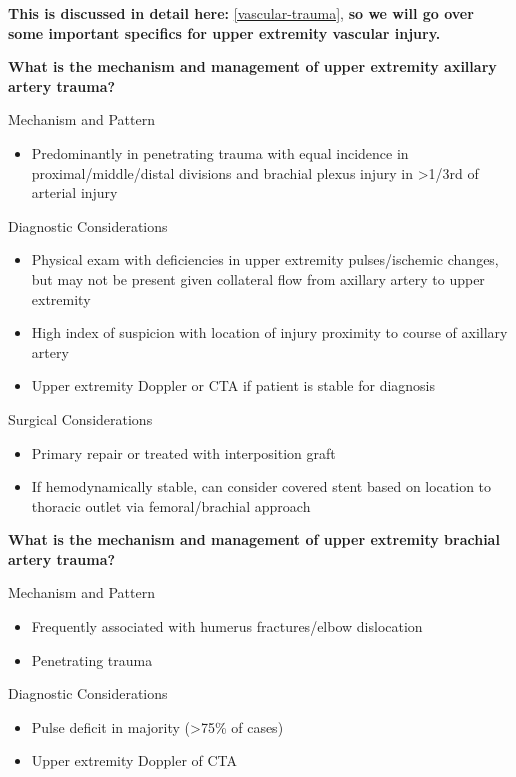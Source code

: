 \documentclass[
]{book}
\providecommand{\tightlist}{%
  \setlength{\itemsep}{0pt}\setlength{\parskip}{0pt}}
\begin{document}
\textbf{This is discussed in detail here:} \ref{vascular-trauma}, \textbf{so we
will go over some important specifics for upper extremity vascular
injury.} \citep{kauvar184VascularTrauma2020}

\textbf{What is the mechanism and management of upper extremity axillary
artery trauma?}

Mechanism and Pattern

\begin{itemize}
\tightlist
\item
  Predominantly in penetrating trauma with equal incidence in
  proximal/middle/distal divisions and brachial plexus injury
  in \textgreater1/3rd of arterial injury
\end{itemize}

Diagnostic Considerations

\begin{itemize}
\item
  Physical exam with deficiencies in upper extremity pulses/ischemic
  changes, but may not be present given collateral flow from axillary
  artery to upper extremity~
\item
  High index of suspicion with location of injury proximity to course
  of axillary artery
\item
  Upper extremity Doppler or CTA if patient is stable for diagnosis
\end{itemize}

Surgical Considerations~

\begin{itemize}
\item
  Primary repair or treated with interposition graft~
\item
  If hemodynamically stable, can consider covered stent based on
  location to thoracic outlet via femoral/brachial approach
\end{itemize}

\textbf{What is the mechanism and management of upper extremity brachial
artery trauma?}

Mechanism and Pattern

\begin{itemize}
\item
  Frequently associated with humerus fractures/elbow dislocation
\item
  Penetrating trauma
\end{itemize}

Diagnostic Considerations

\begin{itemize}
\item
  Pulse deficit in majority (\textgreater75\% of cases)
\item
  Upper extremity Doppler of CTA
\end{itemize}
\end{document}
